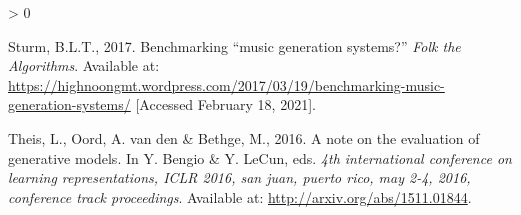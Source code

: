 \documentclass[12pt,a4paper,]{report}
\newlength{\cslhangindent}
\newenvironment{CSLReferences}[2] %
 {%
  \setlength{\parindent}{0pt}
  \ifodd #1 \everypar{\setlength{\hangindent}{\cslhangindent}}\ignorespaces\fi
  \ifnum #2 > 0
  \setlength{\parskip}{#2\baselineskip}
  \fi
 }%
 {}
\begin{document}
\begin{CSLReferences}{1}{0}
\leavevmode\hypertarget{ref-sturm_benchmarking_2017}{}%
Sturm, B.L.T., 2017. Benchmarking {``music generation systems?''}
\emph{Folk the Algorithms}. Available at:
\url{https://highnoongmt.wordpress.com/2017/03/19/benchmarking-music-generation-systems/}
{[}Accessed February 18, 2021{]}.

\leavevmode\hypertarget{ref-theis_note_2016}{}%
Theis, L., Oord, A. van den \& Bethge, M., 2016. A note on the
evaluation of generative models. In Y. Bengio \& Y. LeCun, eds.
\emph{4th international conference on learning representations, {ICLR}
2016, san juan, puerto rico, may 2-4, 2016, conference track
proceedings}. Available at: \url{http://arxiv.org/abs/1511.01844}.

\end{CSLReferences}
\end{document}
